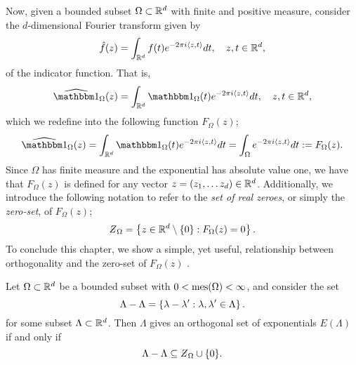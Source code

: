 \documentclass[../thesis.tex]{subfiles}
\begin{document}
Now, given a bounded subset $\Omega\subset \mathbb{R}^d$ with finite and positive measure, consider the $d$-dimensional Fourier transform given by
\begin{equation*}
    \hat{f}(z) = \int_{\mathbb{R}^d} f(t)  e^{-2\pi i \langle z,t\rangle} dt, \quad z,t\in \mathbb{R}^d,
\end{equation*}
of the indicator function. That is, 
\begin{equation*}
    \indicatorFourier{\Omega}{z} = \int_{\R^d} \indicator{\Omega}{t}  e^{-2\pi i \braa{z,t}} dt, \quad z,t\in \R^d,
\end{equation*} 
which we redefine into the following function $F_{\Omega}(z)$;
\begin{equation*}
    \indicatorFourier{\Omega}{z} = \int_{\R^d} \indicator{\Omega}{t}  e^{-2\pi i \braa{z,t}} dt = \int_{\Omega} e^{-2\pi i \braa{z,t}} dt := F_{\Omega}(z).
\end{equation*}
Since $\Omega$ has finite measure and the exponential has absolute value one, we have that $F_{\Omega}(z)$ is defined for any vector $z = (z_1, \dots z_d)\in \mathbb{R}^d$. Additionally, we introduce the following notation to refer to the \emph{set of real zeroes}, or simply the \emph{zero-set}, of $F_{\Omega}(z)$;
\begin{equation*}
    \Zstroke_{\Omega} = \braqMed{ z \in \R^d \setminus \braqMed{0} : F_{\Omega}(z)= 0}.
\end{equation*}
To conclude this chapter, we show a simple, yet useful, relationship between orthogonality and the zero-set of $F_{\Omega}(z)$ \cite{lagariasOrthonormalBasesExponentials2000,jorgensenSpectralPairsCartesian2001}. %
\begin{lemma}
    Let $\Omega \subset \mathbb{R}^d$ be a bounded subset with $0< \operatorname{mes}(\Omega)<\infty$, and consider the set
    \begin{equation}\label{eq:zero_set_orthogonal}
        \Lambda - \Lambda = \left\{\lambda-\lambda' : \lambda,\lambda' \in \Lambda\right\}.
    \end{equation}
    for some subset $\Lambda\subset \mathbb{R}^d$. Then $\Lambda$ gives an orthogonal set of exponentials $E(\Lambda)$ if and only if
    \begin{equation*}
        \Lambda - \Lambda \subseteq \Zstroke_{\Omega} \cup \braq{0}.
    \end{equation*}
\end{lemma}
\end{document}
